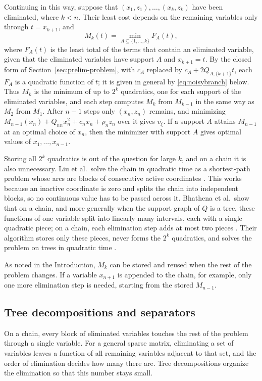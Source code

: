 Continuing in this way, suppose that $(x_1,z_1),\ldots,(x_k,z_k)$ have
been eliminated, where $k<n$. Their least cost depends on the remaining
variables only through $t=x_{k+1}$, and
\begin{equation}\label{eq:chain-k}
 M_k(t)=\min_{A\subseteq\{1,\ldots,k\}}F_A(t),
\end{equation}
where $F_A(t)$ is the least total of the terms that contain an
eliminated variable, given that the eliminated variables have support $A$
and $x_{k+1}=t$. By the closed form of
Section~\ref{sec:prelim-problem}, with $c_A$ replaced by
$c_A+2Q_{A,\{k+1\}}t$, each $F_A$ is a quadratic function of $t$; it is
given in general by \eqref{eq:noisybranch} below. Thus $M_k$ is the
minimum of up to $2^k$ quadratics, one for each support of the eliminated
variables, and each step computes $M_k$ from $M_{k-1}$ in the same way as
$M_2$ from $M_1$. After $n-1$ steps only $(x_n,z_n)$ remains, and
minimizing $M_{n-1}(x_n)+Q_{nn}x_n^2+c_nx_n+\rho_nz_n$ over it gives
$v_\xi$. If a support $A$ attains $M_{n-1}$ at an optimal choice of
$x_n$, then the minimizer with support $A$ gives optimal values of
$x_1,\ldots,x_{n-1}$.

Storing all $2^k$ quadratics is out of the question for large $k$, and on
a chain it is also unnecessary. Liu et al.\ solve the chain in quadratic
time as a shortest-path problem whose arcs are blocks of consecutive
active coordinates \cite{LiuPath}. This works because an inactive
coordinate is zero and splits the chain into independent blocks, so no
continuous value has to be passed across it. Bhathena et al.\ show that
on a chain, and more generally when the support graph of $Q$ is a tree,
these functions of one variable split into linearly many intervals,
each with a single quadratic piece; on a chain, each elimination step
adds at most two pieces
\cite[Proposition~1 and Lemmas~3 and~4]{BhathenaTrees}. Their algorithm
stores only these pieces, never forms the $2^k$ quadratics, and solves
the problem on trees in quadratic time \cite{BhathenaTrees}.

As noted in the Introduction, $M_k$ can be stored and reused when the
rest of the problem changes. If a variable $x_{n+1}$ is appended to the
chain, for example, only one more elimination step is needed, starting
from the stored $M_{n-1}$.

\subsection{Tree decompositions and separators}\label{sec:prelim-treedec}
On a chain, every block of eliminated variables touches the rest of the
problem through a single variable. For a general sparse matrix,
eliminating a set of variables leaves a function of all remaining
variables adjacent to that set, and the order of elimination decides how
many there are. Tree decompositions organize the elimination so that
this number stays small.

